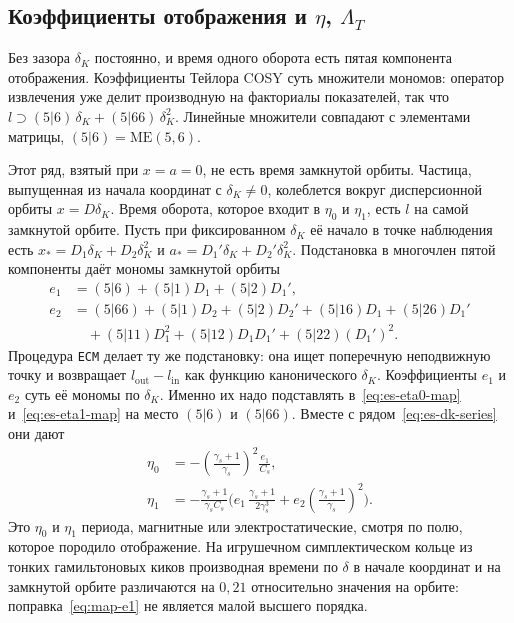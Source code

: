 \documentclass[aps,pra,preprint,a4paper,amsmath,amssymb,longbibliography]{revtex4-2}
\begin{document}
\subsection{Коэффициенты отображения и $\eta$, $\Lambda_T$}
\label{sec:map-coef}

Без зазора $\delta_K$ постоянно, и время одного оборота есть пятая компонента отображения. Коэффициенты Тейлора COSY суть множители мономов: оператор извлечения уже делит производную на факториалы показателей, так что $l\supset(5|6)\,\delta_K+(5|66)\,\delta_K^2$. Линейные множители совпадают с элементами матрицы, $(5|6)=\mathrm{ME}(5,6)$.

Этот ряд, взятый при $x=a=0$, не есть время замкнутой орбиты. Частица, выпущенная из начала координат с $\delta_K\neq 0$, колеблется вокруг дисперсионной орбиты $x=D\delta_K$. Время оборота, которое входит в $\eta_0$ и $\eta_1$, есть $l$ на самой замкнутой орбите. Пусть при фиксированном $\delta_K$ её начало в точке наблюдения есть $x_*=D_1\delta_K+D_2\delta_K^2$ и $a_*=D_1'\delta_K+D_2'\delta_K^2$. Подстановка в многочлен пятой компоненты даёт мономы замкнутой орбиты
\begin{align}
e_1
&=
(5|6)+(5|1)D_1+(5|2)D_1',
\label{eq:map-e1}\\
e_2
&=
(5|66)+(5|1)D_2+(5|2)D_2'
+(5|16)D_1+(5|26)D_1'
\nonumber\\
&\quad
+(5|11)D_1^2+(5|12)D_1 D_1'+(5|22)(D_1')^2.
\label{eq:map-e2}
\end{align}
Процедура \texttt{ECM} делает ту же подстановку: она ищет поперечную неподвижную точку и возвращает $l_{\mathrm{out}}-l_{\mathrm{in}}$ как функцию канонического $\delta_K$. Коэффициенты $e_1$ и $e_2$ суть её мономы по $\delta_K$. Именно их надо подставлять в~\eqref{eq:es-eta0-map} и~\eqref{eq:es-eta1-map} на место $(5|6)$ и $(5|66)$. Вместе с рядом~\eqref{eq:es-dk-series} они дают
\begin{align}
\eta_0
&=
-\left(\frac{\gamma_s+1}{\gamma_s}\right)^2\frac{e_1}{C_s},
\label{eq:map-eta0}\\
\eta_1
&=
-\frac{\gamma_s+1}{\gamma_s C_s}
\Biggl(
e_1\,\frac{\gamma_s+1}{2\gamma_s^3}
+e_2\left(\frac{\gamma_s+1}{\gamma_s}\right)^2
\Biggr).
\label{eq:map-eta1}
\end{align}
Это $\eta_0$ и $\eta_1$ периода, магнитные или электростатические, смотря по полю, которое породило отображение. На игрушечном симплектическом кольце из тонких гамильтоновых киков производная времени по $\delta$ в начале координат и на замкнутой орбите различаются на $0{,}21$ относительно значения на орбите: поправка~\eqref{eq:map-e1} не является малой высшего порядка.
\end{document}
